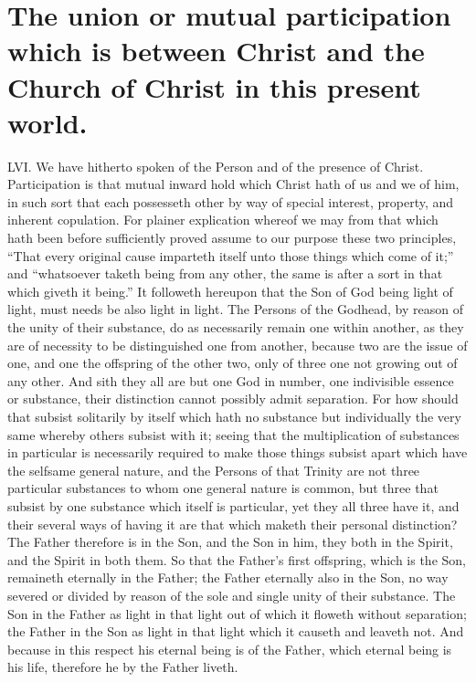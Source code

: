 \section*{The union or mutual participation which is between Christ and the Church of Christ in this present world.}
LVI. We have hitherto spoken of the Person and of the presence of Christ. Participation is that mutual inward hold which Christ hath of us and we of him, in such sort that each possesseth other by way of special interest, property, and inherent copulation. For plainer explication whereof we may from that which hath been before sufficiently proved assume  to our purpose these two principles, “That every original cause imparteth itself unto those things which come of it;” and “whatsoever taketh being from any other, the same is after a sort in that which giveth it being.”
It followeth hereupon that the Son of God being light of light, must needs be also light in light. The Persons of the Godhead, by reason of the unity of their substance, do as necessarily remain one within another, as they are of necessity to be distinguished one from another, because two are the issue of one, and one the offspring of the other two, only of three one not growing out of any other. And sith they all are but one God in number, one indivisible essence or substance, their distinction cannot possibly admit separation. For how should that subsist solitarily by itself which hath no substance but individually the very same whereby others subsist with it; seeing that the multiplication of substances in particular is necessarily required to make those things subsist apart which have the selfsame general nature, and the Persons of that Trinity are not three particular substances to whom one general nature is common, but three that subsist by one substance which itself is particular, yet they all three have it, and their several ways of having it are that which maketh their personal distinction? The Father therefore is in the Son, and the Son in him, they both in the Spirit, and the Spirit in both them. So that the Father’s first offspring, which is the Son, remaineth eternally in the Father; the Father eternally also in the Son, no way severed or divided by reason of the sole and single unity of their substance. The Son in the Father as light in that light out of which it floweth without separation; the Father in the Son as light in that light which it causeth and leaveth not. And because in this respect his eternal being is of the Father, which eternal being is his life, therefore he by the Father liveth.
